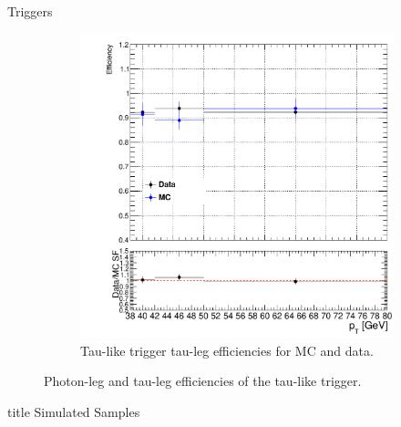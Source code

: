 \documentclass[9pt,aspectratio=1610]{beamer}
\begin{document}
\begin{frame}{Triggers}
\begin{itemize}
\begin{figure}
\begin{subfigure}{0.45\linewidth}
				\includegraphics[width=\textwidth]{figures/misc/tau_trigger_two_prong_efficiencies.pdf}
				\vspace{-2em}
				\caption{Tau-like trigger tau-leg efficiencies for MC and data.}
			\end{subfigure}
			\vspace{-1em}
		\caption{Photon-leg and tau-leg efficiencies of the tau-like trigger.}
		\end{figure}
	\end{itemize}
\end{frame}

\begin{frame}
	\label{sec:simsam}
	\vfill
	\centering
	\begin{beamercolorbox}[sep=8pt,center,shadow=false,rounded=true]{title}
		\Huge Simulated Samples \par%
	\end{beamercolorbox}
	\vfill
\end{frame}
\end{document}
